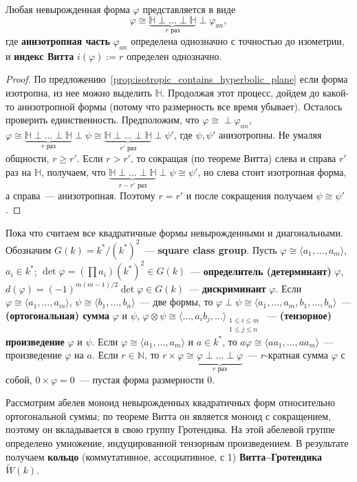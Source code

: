 \documentclass[a4paper,oneside,12pt]{article}
\theoremstyle{plain} { \swapnumbers
\newtheorem{theorem}{Теорема}[subsection]
\newtheorem{corollary}[theorem]{Следствие}
\newtheorem{lemma}[theorem]{Лемма}
\newtheorem{proposition}[theorem]{Утверждение}
\newtheorem{claim}[theorem]{Факт}
}
\theoremstyle{definition} { \swapnumbers
\newtheorem{definition}[theorem]{Определение}
\newtheorem{notation}[theorem]{Обозначение}
\newtheorem{remark}[theorem]{Замечание}
\newtheorem{remarks}[theorem]{Замечания}
\newtheorem{example}[theorem]{Пример}
\newtheorem{examples}[theorem]{Примеры}
\newtheorem{sssection}[theorem]{}
}
\def\tilde{\widetilde}
\def\ph{\varphi}
\def\la{\langle}
\def\ra{\rangle}
\begin{document}
\begin{corollary}
Любая невырожденная форма $\ph$ представляется в виде
$$\ph\cong\underbrace{\mathbb H\perp\dots\perp\mathbb H}_{r\text{ раз}}\perp\ph_{an},$$
где {\bf анизотропная часть} $\ph_{an}$
определена однозначно с точностью до изометрии, и {\bf индекс Витта} $i(\ph):=r$ определен однозначно.
\end{corollary}
\begin{proof}
По предложению~\ref{prop:isotropic_contains_hyperbolic_plane} если форма изотропна, из нее можно выделить
$\mathbb H$. Продолжая этот процесс, дойдем до какой-то анизотропной формы (потому что размерность все
время убывает). Осталось проверить единственность. Предположим, что
$\ph\cong\perp\ph_{an}$,
$\ph\cong\underbrace{\mathbb H\perp\dots\perp\mathbb H}_{r\text{ раз}}\perp \psi
\cong\underbrace{\mathbb H\perp\dots\perp\mathbb H}_{r'\text{ раз}}\perp\psi'$, где $\psi,\psi'$ анизотропны.
Не умаляя общности, $r\geq r'$. Если $r>r'$, то сокращая (по теореме Витта) слева и справа $r'$
раз на $\mathbb H$,
получаем, что $\underbrace{\mathbb H\perp\dots\perp\mathbb H}_{r-r'\text{ раз}}\perp\psi\cong\psi'$,
но слева стоит изотропная форма, а справа~--- анизотропная.
Поэтому $r=r'$ и после сокращения получаем $\psi\cong\psi'$.
\end{proof}

Пока что считаем все квадратичные формы невырожденными и диагональными.
Обозначим $G(k)=k^*/(k^*)^2$~--- {\bf square class group}.
Пусть $\ph\cong\la a_1,\dots,a_m\ra$, $a_i\in k^*$;
$\det\ph=(\prod a_i)(k^*)^2\in G(k)$~--- {\bf определитель (детерминант)} $\ph$,
$d(\ph)=(-1)^{m(m-1)/2}\det\ph\in G(k)$~--- {\bf дискриминант} $\ph$.
Если $\ph\cong\la a_1,\dots,a_m\ra$, $\psi\cong\la b_1,\dots,b_n\ra$~--- две формы, то
$\ph\perp\psi\cong\la a_1,\dots,a_m,b_1,\dots,b_n\ra$~--- {\bf (ортогональная) сумма} $\ph$ и $\psi$,
$\ph\otimes\psi\cong\la\dots,a_ib_j,\dots\ra_{\begin{smallmatrix}1\leq i\leq m\\1\leq j\leq n\end{smallmatrix}}$~---
{\bf (тензорное) произведение} $\ph$ и $\psi$.
Если $\ph\cong\la a_1,\dots,a_m\ra$ и $a\in k^*$, то $a\ph\cong\la aa_1,\dots,aa_m\ra$~--- произведение
$\ph$ на $a$. Если $r\in\mathbb N$, то $r\times\ph\cong\underbrace{\ph\perp\dots\perp\ph}_{r\text{ раз}}$~---
$r$-кратная сумма $\ph$ с собой, $0\times\ph=0$~--- пустая форма размерности 0.

Рассмотрим абелев моноид невырожденных квадратичных форм относительно ортогональной суммы;
по теореме Витта он является моноид с сокращением, поэтому он вкладывается в свою группу
Гротендика. На этой абелевой группе определено умножение, индуцированной тензорным
произведением. В результате получаем {\bf кольцо} (коммутативное, ассоциативное, с 1)
{\bf Витта--Гротендика} $\tilde W(k)$.
\end{document}
